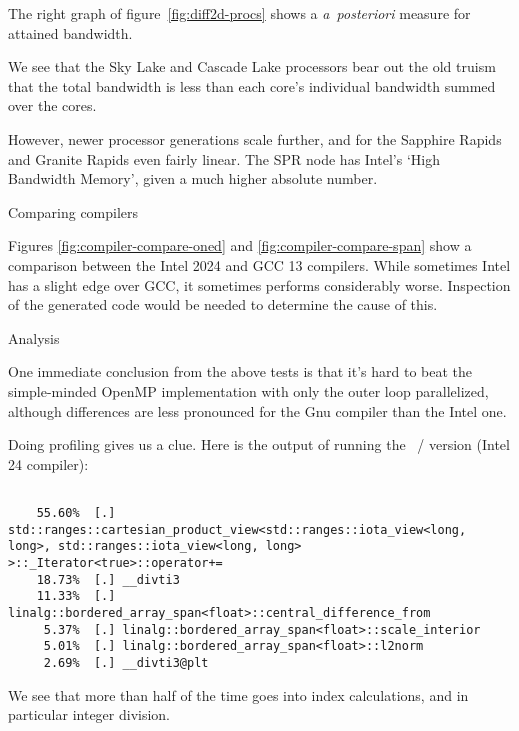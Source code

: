 The right graph of figure~\ref{fig:diff2d-procs} shows a \emph{a~posteriori}
measure for attained bandwidth.


We see that the Sky Lake and Cascade Lake processors bear out the
old truism that the total bandwidth is less than 
each core's individual bandwidth summed over the cores.

However, newer processor generations scale further, and
for the Sapphire Rapids and Granite Rapids even fairly linear.
The SPR node has Intel's `High Bandwidth Memory',
given a much higher absolute number.

 {Comparing compilers}

\begin{figure*}[t]
  \begingroup %
  
  
  \endgroup %
  \caption{Comparing Intel to GCC on `oned' (left) and `clps' (right) scheme}
  \label{fig:compiler-compare-oned}
\end{figure*}

\begin{figure*}[t]
  \begingroup %
  
  
  \endgroup %
  \caption{Comparing Intel to GCC on `span' (left) and `kokkos' (right) scheme}
  \label{fig:compiler-compare-span}
\end{figure*}

Figures \ref{fig:compiler-compare-oned} and \ref{fig:compiler-compare-span}
show a comparison between the Intel 2024 and GCC 13 compilers.
While sometimes Intel has a slight edge over GCC, it sometimes
performs considerably worse.
Inspection of the generated code would be needed to determine the cause of this.

 {Analysis}
\label{sec:d2d-profile}

One immediate conclusion from the above tests is that it's
hard to beat the simple-minded OpenMP implementation
with only the outer loop parallelized,
although differences are less pronounced for the Gnu compiler
than the Intel one.

Doing profiling gives us a clue.
Here is the output of running the ~/ 
version (Intel 24 compiler):
\begin{lstlisting}[language=verbatim]
%% make run_perf VARIANTS=span NSIZE=10000 ECHO=1  

    55.60%  [.] std::ranges::cartesian_product_view<std::ranges::iota_view<long, long>, std::ranges::iota_view<long, long> >::_Iterator<true>::operator+=
    18.73%  [.] __divti3
    11.33%  [.] linalg::bordered_array_span<float>::central_difference_from
     5.37%  [.] linalg::bordered_array_span<float>::scale_interior
     5.01%  [.] linalg::bordered_array_span<float>::l2norm
     2.69%  [.] __divti3@plt
\end{lstlisting}
We see that more than half of the time goes into index calculations,
and in particular integer division.

